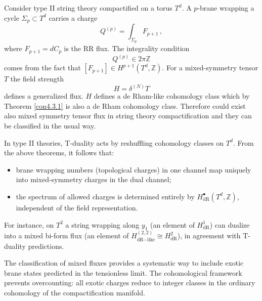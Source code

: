 \documentclass[a4paper,12pt]{article}
\begin{document}
Consider type II string theory compactified on a torus $T^d$. A $p$-brane wrapping a cycle 
$\Sigma_p \subset T^d$ carries a charge
\begin{equation}
Q^{(p)} = \int_{\Sigma_p} F_{p+1} \,,
\end{equation}
where $F_{p+1} = dC_p$ is the RR flux. The integrality condition
\begin{equation}
Q^{(p)} \in 2\pi \mathbb{Z}
\end{equation}
comes from the fact that $[F_{p+1}] \in H^{p+1}(T^d,\mathbb{Z})$. For a mixed-symmetry tensor $T$ the field strength
\begin{equation}
H = \delta^{(N)} T
\end{equation}
defines a generalized flux. $H$ defines a de Rham-like cohomology class which by Theorem \ref{con4.3.1} is also a de Rham cohomology class. Therefore could exist also mixed symmetry tensor flux in string theory compactification and they can be classified in the usual way.

In type II theories, T-duality acts by reshuffling cohomology classes on $T^d$. From the above theorems, it follows that:
\begin{itemize}
  \item brane wrapping numbers (topological charges) in one channel map uniquely into mixed-symmetry charges in the dual channel;
  \item the spectrum of allowed charges is determined entirely by $H^\bullet_{\mathrm{dR}}(T^d,\mathbb{Z})$, independent of the field representation.
\end{itemize}

For instance, on $T^2$ a string wrapping along $y_1$ (an element of $H_{\text{dR}}^1$) can dualize into a mixed bi-form flux (an element of $H^{(2,2)}_{\text{dR}-\text{like} }\cong H^2_{\text{dR}}$), in agreement with T-duality predictions.


The classification of mixed fluxes provides a systematic way to include exotic brane states predicted in the tensionless limit. The cohomological framework prevents overcounting: all exotic charges reduce to integer classes in the ordinary cohomology of the compactification manifold.
\end{document}
